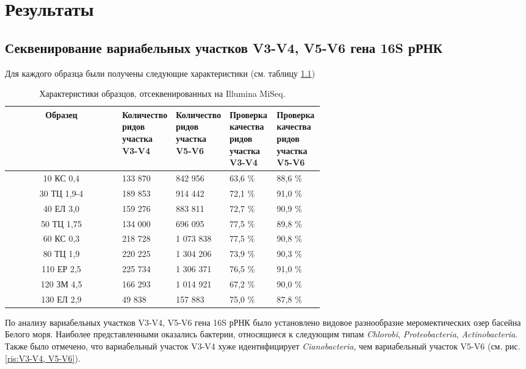 \chapter{Результаты} \label{chapt2}

\section{Секвенирование вариабельных участков V3-V4, V5-V6 гена 16S рРНК} \label{sect2_1}

Для каждого образца были получены следующие характеристики (см. таблицу \ref{tab:16Sread_Ill_characteristic})

\begin{table}[H]
\caption{Характеристики образцов, отсеквенированных на Illumina MiSeq.}\label{tab:16Sread_Ill_characteristic}
\begin{center}
\begin{tabular}{|c|p{0.15\linewidth}|p{0.15\linewidth}|p{0.15\linewidth}|p{0.15\linewidth}|}
\hline
Образец & Количество ридов участка V3-V4 & Количество ридов участка V5-V6 & Проверка качества ридов участка V3-V4 & Проверка качества ридов участка V5-V6 \\
\hline
10 КС 0,4 & 133 870 & 842 956 & 63,6 \% & 88,6 \% \\
30 ТЦ 1,9-4 & 189 853 & 914 442 & 72,1 \% & 91,0 \% \\
40 ЕЛ 3,0 & 159 276 & 883 811 & 72,7 \% & 90,9 \% \\
50 ТЦ 1,75 & 134 000 & 696 095 & 77,5 \% & 89,8 \% \\
60 КС 0,3 & 218 728 & 1 073 838 & 77,5 \% & 90,8 \% \\
80 ТЦ 1,9 & 220 225 & 1 304 206 & 73,9 \% & 90,3 \% \\
110 ЕР 2,5 & 225 734 & 1 306 371 & 76,5 \% & 91,0 \% \\
120 ЗМ 4,5 & 166 293 & 1 014 921 & 67,2 \% & 90,0 \% \\
130 ЕЛ 2,9 & 49 838 & 157 883 & 75,0 \% & 87,8 \% \\
\hline
\end{tabular}
\end{center}
\end{table}

По анализу вариабельных участков V3-V4, V5-V6 гена 16S рРНК было установлено видовое разнообразие меромектических озер басейна Белого моря. Наиболее представленными оказались бактерии, относящиеся к следующим типам \textit{Chlorobi}, \textit{Proteobacteria}, \textit{Actinobacteria}.  Также было отмечено, что вариабельный участок V3-V4 хуже идентифицирует \textit{Cianobacteria}, чем вариабельный участок V5-V6   (см. рис. \ref{ris:V3-V4, V5-V6}). 


